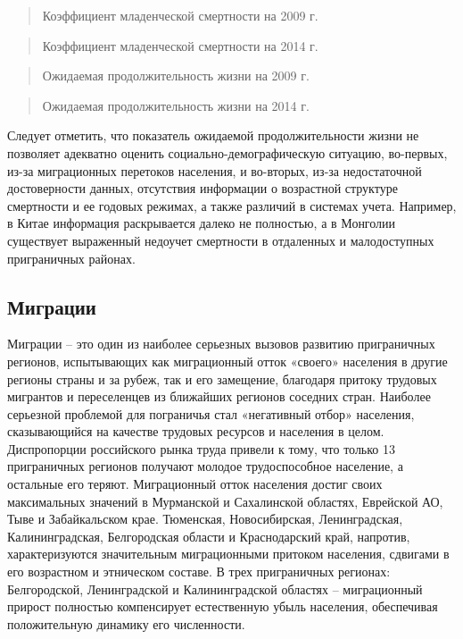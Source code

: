 \documentclass[]{book}
\begin{document}
\begin{quote}
Коэффициент младенческой смертности на 2009 г.
\end{quote}

\begin{quote}
Коэффициент младенческой смертности на 2014 г.
\end{quote}

\begin{quote}
Ожидаемая продолжительность жизни на 2009 г.
\end{quote}

\begin{quote}
Ожидаемая продолжительность жизни на 2014 г.
\end{quote}

Следует отметить, что показатель ожидаемой продолжительности жизни не
позволяет адекватно оценить социально-демографическую ситуацию,
во-первых, из-за миграционных перетоков населения, и во-вторых, из-за
недостаточной достоверности данных, отсутствия информации о возрастной
структуре смертности и ее годовых режимах, а также различий в системах
учета. Например, в Китае информация раскрывается далеко не полностью, а
в Монголии существует выраженный недоучет смертности в отдаленных и
малодоступных приграничных районах.

\subsection{Миграции}\label{demo-situ-mig}

Миграции -- это один из наиболее серьезных вызовов развитию приграничных
регионов, испытывающих как миграционный отток «своего» населения в
другие регионы страны и за рубеж, так и его замещение, благодаря притоку
трудовых мигрантов и переселенцев из ближайших регионов соседних стран.
Наиболее серьезной проблемой для пограничья стал «негативный отбор»
населения, сказывающийся на качестве трудовых ресурсов и населения в
целом. Диспропорции российского рынка труда привели к тому, что только
13 приграничных регионов получают молодое трудоспособное население, а
остальные его теряют. Миграционный отток населения достиг своих
максимальных значений в Мурманской и Сахалинской областях, Еврейской АО,
Тыве и Забайкальском крае. Тюменская, Новосибирская, Ленинградская,
Калининградская, Белгородская области и Краснодарский край, напротив,
характеризуются значительным миграционными притоком населения, сдвигами
в его возрастном и этническом составе. В трех приграничных регионах:
Белгородской, Ленинградской и Калининградской областях -- миграционный
прирост полностью компенсирует естественную убыль населения, обеспечивая
положительную динамику его численности.
\end{document}
